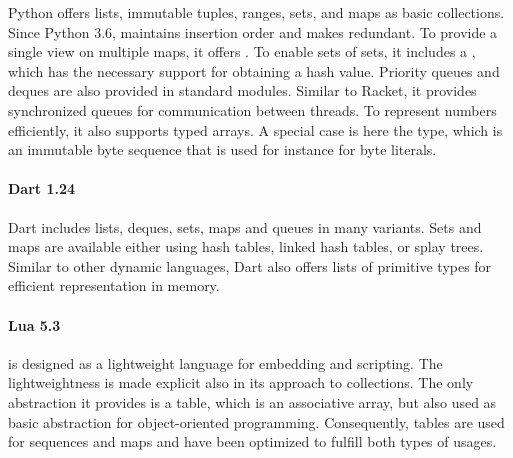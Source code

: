 \documentclass[sigconf, authorversion]{acmart}
\begin{document}

Python offers lists,
immutable tuples, ranges,
sets, and maps as basic collections.
Since Python 3.6,  maintains insertion order and
makes  redundant.
To provide a single view on multiple maps,
it offers .
To enable sets of sets, it includes a ,
which has the necessary support for obtaining a hash value.
Priority queues and deques are also provided in standard modules.
Similar to Racket,
it provides synchronized queues
for communication between threads.
To represent numbers efficiently, it also supports typed arrays.
A special case is here the  type,
which is an immutable byte sequence that is used for instance for byte literals.

\paragraph{Dart 1.24}

Dart includes lists, deques, sets, maps and queues in many variants.
Sets and maps are available either using hash tables,
linked hash tables, or splay trees.
Similar to other dynamic languages,
Dart also offers lists of primitive types
for efficient representation in memory.



\paragraph{Lua 5.3}
\label{sec:lua53}

is designed as a lightweight language for embedding and scripting.
The lightweightness is made explicit also in its approach to collections.
The only abstraction it provides is a table, which is an associative array,
but also used as basic abstraction for object-oriented programming.
Consequently, tables are used for sequences and maps
and have been optimized
to fulfill both types of usages\citep{The_implementation_of_lua}.
\end{document}
